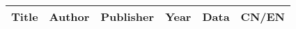 \documentclass[a4paper,10pt,titlepage]{ctexart}
\title{}
\author{}
\date{\today}
\begin{document}
\begin{center}
	\begin{longtable}{%
		| m{}<{\centering}
		| m{}<{\centering}
		| m{}<{\centering}
		| m{}<{\centering}
		| m{}<{\centering}
		| m{}<{\centering}
		|}
		\hline
		\textbf{Title} & \textbf{Author} & \textbf{Publisher} & \textbf{Year} & \textbf{Data} & \textbf{CN/EN} \\
		\hline
		
		
	\end{longtable}
\end{center}
\end{document}
